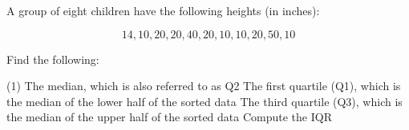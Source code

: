 \documentclass[../mathNotesPreamble]{subfiles}
\begin{document}
  \begin{ex*}
    A group of eight children have the following heights (in inches):
    
    \noindent
    \begin{minipage}{0.4\linewidth}
      \[14, 10, 20, 20, 40, 20, 10, 10, 20, 50, 10\]
    \end{minipage}
    \begin{minipage}{0.575\linewidth}
      \centering
    \end{minipage}
    \vspace*{\baselineskip}
    
    \noindent
    Find the following:
    \begin{tasks}[after-item-skip=\stretch{1}, label=\textbullet](1)
      \task The median, which is also referred to as Q2
      \task The first quartile (Q1), which is the median of the lower half of the sorted data
      \task The third quartile (Q3), which is the median of the upper half of the sorted data
      \task Compute the IQR
    \end{tasks}
  \end{ex*}

  \pagebreak
\end{document}
